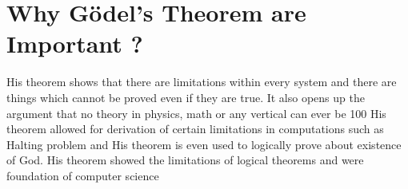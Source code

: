 \documentclass{article}
\begin{document}
\section{Why Gödel's Theorem are Important ?}
His theorem shows that there are limitations within every system and there are things which cannot be proved even if they are true. It also opens up the argument that no theory in physics, math or any vertical can ever be 100%
His theorem allowed for derivation of certain limitations in computations such as Halting problem and His theorem is even used to logically prove about existence of God.
His theorem showed the limitations of logical theorems and were foundation of computer science 
\end{document}

